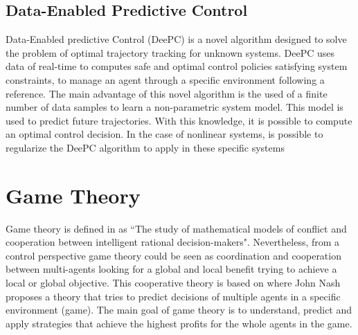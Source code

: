 





\subsection{Data-Enabled Predictive Control}

{\color{blue}
 Data-Enabled predictive Control (DeePC) is a novel algorithm designed to solve the problem of optimal trajectory tracking for unknown systems. DeePC uses data of real-time to computes safe and optimal control policies satisfying system constraints, to manage an agent through a specific environment following a reference. The main advantage of this novel algorithm is the used of a finite number of data samples to learn a non-parametric system model. This model is used to predict future trajectories. With this knowledge, it is possible to compute an optimal control decision. In the case of nonlinear systems, is possible to regularize the DeePC algorithm to apply in these specific systems
}

\section{Game Theory}

{\color{blue}
Game theory is defined in \cite{GameTheory2} as ``The study of mathematical models of conflict and cooperation between intelligent rational decision-makers". Nevertheless, from a control perspective game theory could be seen as coordination and cooperation between multi-agents looking for a global and local benefit trying to achieve a local or global objective. This cooperative theory is based on \cite{paper_nash} where John Nash proposes a theory that tries to predict decisions of multiple agents in a specific environment (game). The main goal of game theory is to understand, predict and apply strategies that achieve the highest profits for the whole agents in the game.
}


